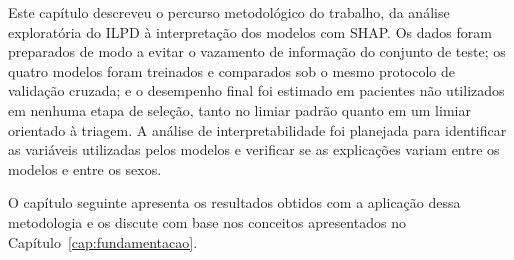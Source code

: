 Este capítulo descreveu o percurso metodológico do trabalho, da análise exploratória do ILPD à interpretação dos modelos com SHAP. Os dados foram preparados de modo a evitar o vazamento de informação do conjunto de teste; os quatro modelos foram treinados e comparados sob o mesmo protocolo de validação cruzada; e o desempenho final foi estimado em pacientes não utilizados em nenhuma etapa de seleção, tanto no limiar padrão quanto em um limiar orientado à triagem. A análise de interpretabilidade foi planejada para identificar as variáveis utilizadas pelos modelos e verificar se as explicações variam entre os modelos e entre os sexos.

O capítulo seguinte apresenta os resultados obtidos com a aplicação dessa metodologia e os discute com base nos conceitos apresentados no Capítulo~\ref{cap:fundamentacao}.
